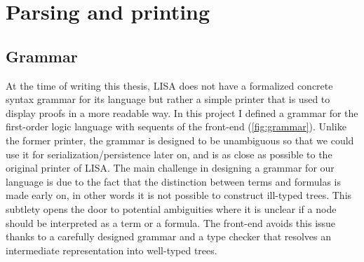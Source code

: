 \section{Parsing and printing}
\label{sec:parsing-printing}

\subsection{Grammar}

At the time of writing this thesis, LISA does not have a formalized concrete syntax grammar for its language but rather a simple printer that is used to display proofs in a more readable way. In this project I defined a grammar for the first-order logic language with sequents of the front-end (\autoref{fig:grammar}). Unlike the former printer, the grammar is designed to be unambiguous so that we could use it for serialization/persistence later on, and is as close as possible to the original printer of LISA. The main challenge in designing a grammar for our language is due to the fact that the distinction between terms and formulas is made early on, in other words it is not possible to construct ill-typed trees. This subtlety opens the door to potential ambiguities where it is unclear if a node should be interpreted as a term or a formula. The front-end avoids this issue thanks to a carefully designed grammar and a type checker that resolves an intermediate representation into well-typed trees.

